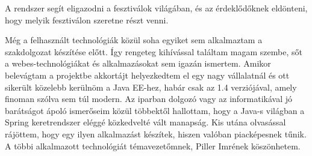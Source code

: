 

A rendszer segít eligazodni a fesztiválok világában, és az érdeklődőknek eldönteni, hogy melyik fesztiválon szeretne részt venni.

Még a felhasznált technológiák közül soha egyiket sem alkalmaztam a szakdolgozat készítése előtt. Így rengeteg kihívással találtam magam szembe, sőt a webes-technológiákat és alkalmazásokat sem igazán ismertem. Amikor belevágtam a projektbe akkortájt helyezkedtem el egy nagy vállalatnál és ott sikerült közelebb kerülnöm a Java EE-hez, habár csak az 1.4 verziójával, amely finoman szólva sem túl modern. Az iparban dolgozó vagy az informatikával jó barátságot ápoló ismerőseim közül többektől hallottam, hogy a Java-s világban a Spring keretrendszer eléggé közkedvelté vált manapság. Kis utána olvasással rájöttem, hogy egy ilyen alkalmazást készítek, hiszen valóban piacképesnek tűnik. A többi alkalmazott technológiát témavezetőmnek, Piller Imrének köszönhetem. 